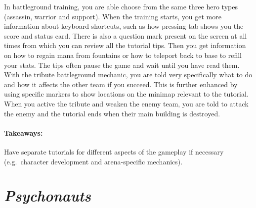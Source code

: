 In battleground training, you are able choose from the same three hero types (assassin, warrior and support).
When the training starts, you get more information about keyboard shortcuts, such as how pressing tab shows you the score and status card.
There is also a question mark present on the screen at all times from which you can review all the tutorial tips.
Then you get information on how to regain mana from fountains or how to teleport back to base to refill your stats.
The tips often pause the game and wait until you have read them.
With the tribute battleground mechanic, you are told very specifically what to do and how it affects the other team if you succeed. This is further enhanced by using specific markers to show locations on the minimap relevant to the tutorial.
When you active the tribute and weaken the enemy team, you are told to attack the enemy and the tutorial ends when their main building is destroyed.
\paragraph{Takeaways:}
Have separate tutorials for different aspects of the gameplay if necessary (e.g.\ character development and arena-specific mechanics).

\section{\textit{Psychonauts}}
